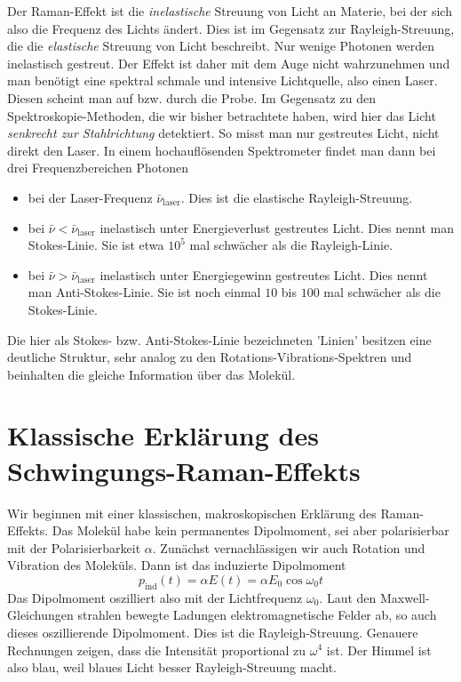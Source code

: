 Der Raman-Effekt ist die \emph{inelastische} Streuung von Licht an Materie, bei der sich also die Frequenz des Lichts ändert. Dies ist im Gegensatz zur Rayleigh-Streuung, die die \emph{elastische} Streuung von Licht beschreibt. Nur wenige Photonen werden inelastisch gestreut. Der Effekt ist daher mit dem Auge nicht wahrzunehmen und man benötigt eine spektral schmale und intensive Lichtquelle, also einen Laser. Diesen scheint man auf bzw. durch die Probe. Im Gegensatz zu den Spektroskopie-Methoden, die wir bisher betrachtete haben, wird hier das Licht \emph{senkrecht zur Stahlrichtung} detektiert. So misst man nur gestreutes Licht, nicht direkt den Laser. In einem hochauflösenden Spektrometer findet man dann bei drei Frequenzbereichen Photonen
\begin{itemize} \setlength{\itemsep}{0pt}
\item bei der Laser-Frequenz $\bar{\nu}_\text{laser}$. Dies ist die elastische Rayleigh-Streuung.
\item bei $\bar{\nu} < \bar{\nu}_\text{laser}$ inelastisch unter Energieverlust  gestreutes Licht. Dies nennt man Stokes-Linie. Sie ist etwa $10^{5}$ mal schwächer als die Rayleigh-Linie.
\item bei $\bar{\nu} > \bar{\nu}_\text{laser}$ inelastisch unter Energiegewinn gestreutes Licht. Dies nennt man Anti-Stokes-Linie. Sie ist noch einmal $10$ bis $100$ mal schwächer als die Stokes-Linie.
\end{itemize}
Die hier als Stokes- bzw. Anti-Stokes-Linie bezeichneten 'Linien' besitzen eine deutliche Struktur, sehr analog zu den Rotations-Vibrations-Spektren und beinhalten die gleiche Information über das Molekül.


\section{Klassische Erklärung des Schwingungs-Raman-Effekts}

Wir beginnen mit einer klassischen, makroskopischen Erklärung des Raman-Effekts. Das Molekül habe kein permanentes Dipolmoment, sei aber polarisierbar mit der Polarisierbarkeit $\alpha$. Zunächst vernachlässigen wir auch Rotation und Vibration des Moleküls. Dann ist das induzierte Dipolmoment
\begin{equation}
p_\text{ind}(t) = \alpha E(t) = \alpha E_0 \cos \omega_0 t
\end{equation}
Das Dipolmoment oszilliert also mit der Lichtfrequenz $\omega_0$. Laut den Maxwell-Gleichungen strahlen bewegte Ladungen elektromagnetische Felder ab, so auch dieses oszillierende Dipolmoment. Dies ist die Rayleigh-Streuung. Genauere Rechnungen zeigen, dass die Intensität proportional zu $\omega^4$ ist. Der Himmel ist also blau, weil blaues Licht besser Rayleigh-Streuung macht.

